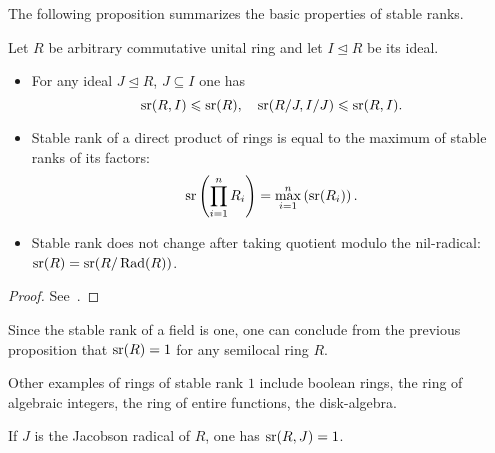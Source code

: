 The following proposition summarizes the basic properties of stable ranks.
\begin{prop} \label{prop:sr_properties}
Let $R$ be arbitrary commutative unital ring and let $I\trianglelefteq R$ be its ideal.
\begin{itemize}
\item For any ideal $J\trianglelefteq R$, $J\subseteq I$ one has 
\[ \operatorname{sr}(R,I)\leqslant\operatorname{sr}(R),\quad\operatorname{sr}(R/J,I/J)\leqslant\operatorname{sr}(R,I). \]
\item Stable rank of a direct product of rings is equal to the maximum of stable ranks of its factors:
\[ \operatorname{sr}\left(\prod\limits_{i=1}^n R_i\right)=\max\limits_{i=1}^n\left(\operatorname{sr}(R_i)\right). \]
\item Stable rank does not change after taking quotient modulo the nil-radical: $\operatorname{sr}(R)=\operatorname{sr}(R/\operatorname{Rad}(R))$.
\end{itemize}
\end{prop}
\begin{proof} See~\cite{Va71}. \end{proof}
\begin{example}
Since the stable rank of a field is one, one can conclude from the previous proposition that $\operatorname{sr}(R)=1$ for any semilocal ring $R$.
\end{example}
\begin{example}
Other examples of rings of stable rank $1$ include boolean rings, the ring of algebraic integers, the ring of entire functions, the disk-algebra.
\end{example}
\begin{example}
If $J$ is the Jacobson radical of $R$, one has $\operatorname{sr}(R,J)=1$.
\end{example}

